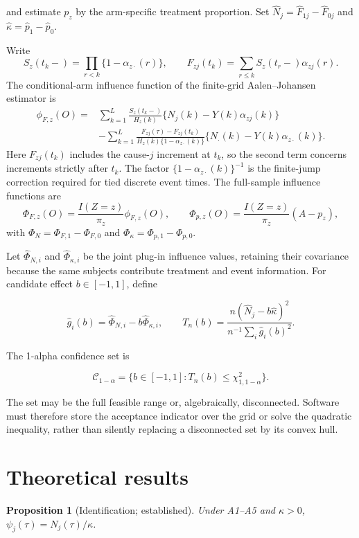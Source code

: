 \documentclass[
  10pt,
  letterpaper,
]{article}
\newtheorem{proposition}{Proposition}
\begin{document}
and estimate $p_z$ by the arm-specific treatment proportion. Set
$\widehat N_j=\widehat F_{1j}-\widehat F_{0j}$ and
$\widehat\kappa=\widehat p_1-\widehat p_0$.

Write
\[
S_z(t_k-)=\prod_{r<k}\{1-\alpha_{z\cdot}(r)\},\qquad
F_{zj}(t_k)=\sum_{r\le k}S_z(t_r-)\alpha_{zj}(r).
\]
The conditional-arm influence function of the finite-grid
Aalen--Johansen estimator is
\begin{align}
\phi_{F,z}(O)
={}&\sum_{k=1}^{L}\frac{S_z(t_k-)}{H_z(k)}
\{N_j(k)-Y(k)\alpha_{zj}(k)\}\nonumber\\
&-\sum_{k=1}^{L}
\frac{F_{zj}(\tau)-F_{zj}(t_k)}
{H_z(k)\{1-\alpha_{z\cdot}(k)\}}
\{N_{\cdot}(k)-Y(k)\alpha_{z\cdot}(k)\}.
\label{eq:discrete-aj-if}
\end{align}
Here $F_{zj}(t_k)$ includes the cause-$j$ increment at $t_k$, so the
second term concerns increments strictly after $t_k$. The factor
$\{1-\alpha_{z\cdot}(k)\}^{-1}$ is the finite-jump correction required
for tied discrete event times. The full-sample influence functions are
\[
\Phi_{F,z}(O)=\frac{I(Z=z)}{\pi_z}\phi_{F,z}(O),\qquad
\Phi_{p,z}(O)=\frac{I(Z=z)}{\pi_z}(A-p_z),
\]
with $\Phi_N=\Phi_{F,1}-\Phi_{F,0}$ and
$\Phi_\kappa=\Phi_{p,1}-\Phi_{p,0}$.

Let $\widehat\Phi_{N,i}$ and $\widehat\Phi_{\kappa,i}$ be the joint
plug-in influence values, retaining their covariance because the same
subjects contribute treatment and event information. For candidate
effect $b\in[-1,1]$, define

\[
\widehat g_i(b)=\widehat\Phi_{N,i}-b\widehat\Phi_{\kappa,i},\qquad
T_n(b)=\frac{n(\widehat N_j-b\widehat\kappa)^2}{n^{-1}\sum_i\widehat g_i(b)^2}.
\]

The 1-alpha confidence set is

\[
\mathcal C_{1-\alpha}=\{b\in[-1,1]:T_n(b)\le\chi^2_{1,1-\alpha}\}.
\]

The set may be the full feasible range or, algebraically, disconnected.
Software must therefore store the acceptance indicator over the grid or
solve the quadratic inequality, rather than silently replacing a
disconnected set by its convex hull.

\section{Theoretical results}

\begin{proposition}[Identification; established]
Under A1--A5 and $\kappa>0$,
$\psi_j(\tau)=N_j(\tau)/\kappa$.
\end{proposition}
\end{document}

